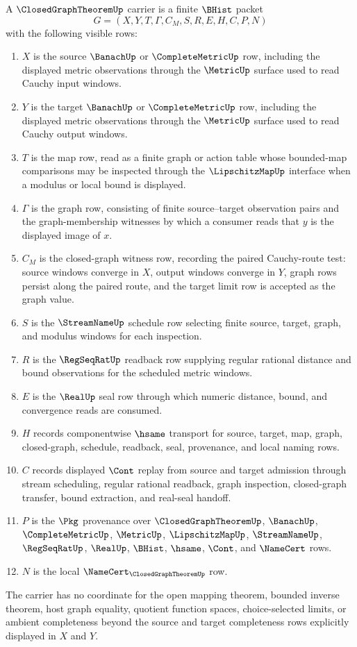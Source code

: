 \begin{definition}
\label{def:closed-graph-theorem-carrier}
A $\ClosedGraphTheoremUp$ carrier is a finite $\BHist$ packet
$$
G=(X,Y,T,\Gamma,C_M,S,R,E,H,C,P,N)
$$
with the following visible rows:
\begin{enumerate}
\item $X$ is the source $\BanachUp$ or $\CompleteMetricUp$ row, including the displayed metric observations through the $\MetricUp$ surface used to read Cauchy input windows.
\item $Y$ is the target $\BanachUp$ or $\CompleteMetricUp$ row, including the displayed metric observations through the $\MetricUp$ surface used to read Cauchy output windows.
\item $T$ is the map row, read as a finite graph or action table whose bounded-map comparisons may be inspected through the $\LipschitzMapUp$ interface when a modulus or local bound is displayed.
\item $\Gamma$ is the graph row, consisting of finite source--target observation pairs and the graph-membership witnesses by which a consumer reads that $y$ is the displayed image of $x$.
\item $C_M$ is the closed-graph witness row, recording the paired Cauchy-route test: source windows converge in $X$, output windows converge in $Y$, graph rows persist along the paired route, and the target limit row is accepted as the graph value.
\item $S$ is the $\StreamNameUp$ schedule row selecting finite source, target, graph, and modulus windows for each inspection.
\item $R$ is the $\RegSeqRatUp$ readback row supplying regular rational distance and bound observations for the scheduled metric windows.
\item $E$ is the $\RealUp$ seal row through which numeric distance, bound, and convergence reads are consumed.
\item $H$ records componentwise $\hsame$ transport for source, target, map, graph, closed-graph, schedule, readback, seal, provenance, and local naming rows.
\item $C$ records displayed $\Cont$ replay from source and target admission through stream scheduling, regular rational readback, graph inspection, closed-graph transfer, bound extraction, and real-seal handoff.
\item $P$ is the $\Pkg$ provenance over $\ClosedGraphTheoremUp$, $\BanachUp$, $\CompleteMetricUp$, $\MetricUp$, $\LipschitzMapUp$, $\StreamNameUp$, $\RegSeqRatUp$, $\RealUp$, $\BHist$, $\hsame$, $\Cont$, and $\NameCert$ rows.
\item $N$ is the local $\NameCert_{\ClosedGraphTheoremUp}$ row.
\end{enumerate}
The carrier has no coordinate for the open mapping theorem, bounded inverse theorem, host graph equality, quotient function spaces, choice-selected limits, or ambient completeness beyond the source and target completeness rows explicitly displayed in $X$ and $Y$.
\end{definition}

